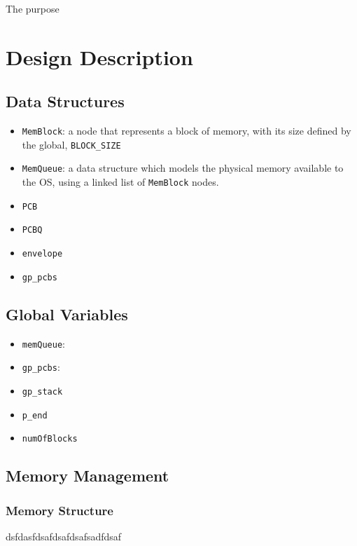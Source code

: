 \documentclass[12pt]{report}
\begin{document}
The purpose

\chapter{Design Description}

\section{Data Structures}
\begin{itemize}
  \item \texttt{MemBlock}: a node that represents a block of memory, with its size defined by the global, \texttt{BLOCK_SIZE}
  \item \texttt{MemQueue}: a data structure which models the physical memory available to the OS, using a linked list of \texttt{MemBlock} nodes.

  \item \texttt{PCB}
  \item \texttt{PCBQ}
  \item \texttt{envelope}
  \item \texttt{gp_pcbs}
\end{itemize}

\section{Global Variables}
\begin{itemize}
  \item \texttt{memQueue}:
  \item \texttt{gp_pcbs}:
  \item \texttt{gp_stack}
  \item \texttt{p_end}
  \item \texttt{numOfBlocks}
\end{itemize}

\section{Memory Management}

\subsection{Memory Structure}

dsfdasfdsafdsafdsafsadfdsaf
\end{document}
